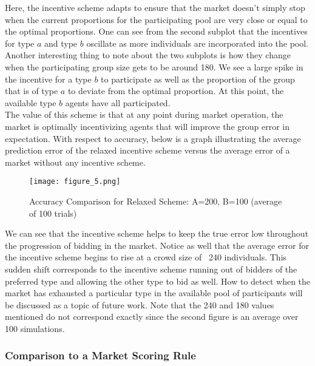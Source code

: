 \documentclass[twoside,twocolumn]{article}
\begin{document}
Here, the incentive scheme adapts to ensure that the market doesn't simply stop when the current proportions for the participating pool are very close or equal to the optimal proportions. One can see from the second subplot that the incentives for type $a$ and type $b$ oscillate as more individuals are incorporated into the pool.\\

Another interesting thing to note about the two subplots is how they change when the participating group size gets to be around 180. We see a large spike in the incentive for a type $b$ to participate as well as the proportion of the group that is of type $a$ to deviate from the optimal proportion. At this point, the available type $b$ agents have all participated.\\

The value of this scheme is that at any point during market operation, the market is optimally incentivizing agents that will improve the group error in expectation. With respect to accuracy, below is a graph illustrating the average prediction error of the relaxed incentive scheme versus the average error of a market without any incentive scheme.\\

\begin{figure}[h]
\centering
\texttt{[image: figure\_5.png]}
\caption{Accuracy Comparison for Relaxed Scheme: A=200, B=100 (average of 100 trials)}
\end{figure}

We can see that the incentive scheme helps to keep the true error low throughout the progression of bidding in the market. Notice as well that the average error for the incentive scheme begins to rise at a crowd size of ~240 individuals. This sudden shift corresponds to the incentive scheme running out of bidders of the preferred type and allowing the other type to bid as well. How to detect when the market has exhausted a particular type in the available pool of participants will be discussed as a topic of future work. Note that the 240 and 180 values mentioned do not correspond exactly since the second figure is an average over 100 simulations.

\subsubsection{Comparison to a Market Scoring Rule}
\end{document}
